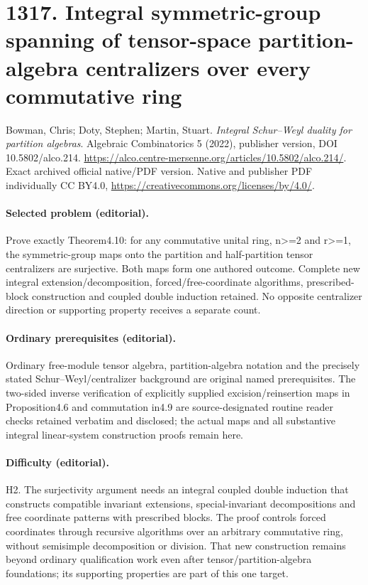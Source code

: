 \documentclass[10pt]{article}
\theoremstyle{definition}
\begin{document}
\section*{1317. Integral symmetric-group spanning of tensor-space partition-algebra centralizers over every commutative ring}
Bowman, Chris; Doty, Stephen; Martin, Stuart. \emph{Integral Schur–Weyl duality for partition algebras}. Algebraic Combinatorics 5 (2022), publisher version, DOI 10.5802/alco.214. \url{https://alco.centre-mersenne.org/articles/10.5802/alco.214/}. Exact archived official native/PDF version. Native and publisher PDF individually CC BY4.0, \url{https://creativecommons.org/licenses/by/4.0/}.
\paragraph{Selected problem (editorial).} Prove exactly Theorem4.10: for any commutative unital ring, n>=2 and r>=1, the symmetric-group maps onto the partition and half-partition tensor centralizers are surjective. Both maps form one authored outcome. Complete new integral extension/decomposition, forced/free-coordinate algorithms, prescribed-block construction and coupled double induction retained. No opposite centralizer direction or supporting property receives a separate count.
\paragraph{Ordinary prerequisites (editorial).} Ordinary free-module tensor algebra, partition-algebra notation and the precisely stated Schur--Weyl/centralizer background are original named prerequisites. The two-sided inverse verification of explicitly supplied excision/reinsertion maps in Proposition4.6 and commutation in4.9 are source-designated routine reader checks retained verbatim and disclosed; the actual maps and all substantive integral linear-system construction proofs remain here.
\paragraph{Difficulty (editorial).} H2. The surjectivity argument needs an integral coupled double induction that constructs compatible invariant extensions, special-invariant decompositions and free coordinate patterns with prescribed blocks. The proof controls forced coordinates through recursive algorithms over an arbitrary commutative ring, without semisimple decomposition or division. That new construction remains beyond ordinary qualification work even after tensor/partition-algebra foundations; its supporting properties are part of this one target.
\end{document}
